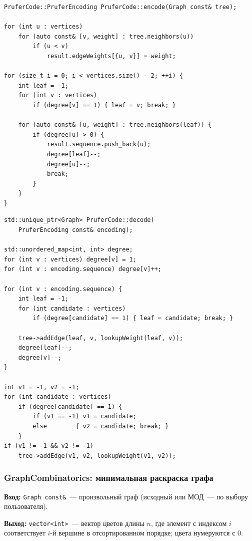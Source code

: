\begin{lstlisting}[style=cppstyle, caption={Кодирование: сохранение весов, поиск листа и заполнение последовательности (PruferCode.cc)}]
PruferCode::PruferEncoding PruferCode::encode(Graph const& tree);

for (int u : vertices)
    for (auto const& [v, weight] : tree.neighbors(u))
        if (u < v)
            result.edgeWeights[{u, v}] = weight;

for (size_t i = 0; i < vertices.size() - 2; ++i) {
    int leaf = -1;
    for (int v : vertices)
        if (degree[v] == 1) { leaf = v; break; }

    for (auto const& [u, weight] : tree.neighbors(leaf)) {
        if (degree[u] > 0) {
            result.sequence.push_back(u);
            degree[leaf]--;
            degree[u]--;
            break;
        }
    }
}
\end{lstlisting}

\begin{lstlisting}[style=cppstyle, caption={Декодирование: восстановление степеней, добавление рёбер и последнее ребро (PruferCode.cc)}]
std::unique_ptr<Graph> PruferCode::decode(
    PruferEncoding const& encoding);

std::unordered_map<int, int> degree;
for (int v : vertices) degree[v] = 1;
for (int v : encoding.sequence) degree[v]++;

for (int v : encoding.sequence) {
    int leaf = -1;
    for (int candidate : vertices)
        if (degree[candidate] == 1) { leaf = candidate; break; }

    tree->addEdge(leaf, v, lookupWeight(leaf, v));
    degree[leaf]--;
    degree[v]--;
}

int v1 = -1, v2 = -1;
for (int candidate : vertices)
    if (degree[candidate] == 1) {
        if (v1 == -1) v1 = candidate;
        else        { v2 = candidate; break; }
    }
if (v1 != -1 && v2 != -1)
    tree->addEdge(v1, v2, lookupWeight(v1, v2));
\end{lstlisting}

\subsubsection{GraphCombinatorics: минимальная раскраска графа}

\textbf{Вход:} \texttt{Graph const\&}~--- произвольный граф
(исходный или МОД~--- по выбору пользователя).

\textbf{Выход:} \texttt{vector<int>}~--- вектор цветов длины $n$,
где элемент с индексом $i$ соответствует $i$-й вершине в
отсортированном порядке; цвета нумеруются с $0$.

